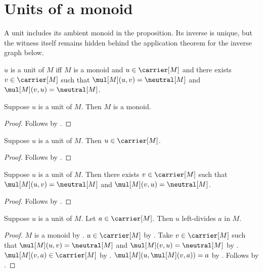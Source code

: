 





\section{Units of a monoid}

A unit includes its ambient monoid in the proposition.  Its inverse is unique,
but the witness itself remains hidden behind the application theorem for the
inverse graph below.

\begin{definition}\label{monoid_unit}
    $u$ is a unit of $M$ iff
        $M$ is a monoid and $u\in\carrier[M]$ and
        there exists $v\in\carrier[M]$ such that
            $\mul[M](u,v)=\neutral[M]$ and
            $\mul[M](v,u)=\neutral[M]$.
\end{definition}

\begin{proposition}\label{monoid_unit_ambient_monoid}
    Suppose $u$ is a unit of $M$.
    Then $M$ is a monoid.
\end{proposition}
\begin{proof}
    Follows by .
\end{proof}

\begin{proposition}\label{monoid_unit_in_carrier}
    Suppose $u$ is a unit of $M$.
    Then $u\in\carrier[M]$.
\end{proposition}
\begin{proof}
    Follows by .
\end{proof}

\begin{proposition}\label{monoid_unit_has_inverse}
    Suppose $u$ is a unit of $M$.
    Then there exists $v\in\carrier[M]$ such that
        $\mul[M](u,v)=\neutral[M]$ and
        $\mul[M](v,u)=\neutral[M]$.
\end{proposition}
\begin{proof}
    Follows by .
\end{proof}

\begin{theorem}\label{monoid_unit_left_divides}
    Suppose $u$ is a unit of $M$.
    Let $a\in\carrier[M]$.
    Then $u$ left-divides $a$ in $M$.
\end{theorem}
\begin{proof}
    $M$ is a monoid by .
    $u\in\carrier[M]$ by .
    Take $v\in\carrier[M]$ such that
        $\mul[M](u,v)=\neutral[M]$ and
        $\mul[M](v,u)=\neutral[M]$ by
        .
    $\mul[M](v,a)\in\carrier[M]$ by
        .
    $\mul[M](u,\mul[M](v,a))=a$ by
        .
    Follows by .
\end{proof}

